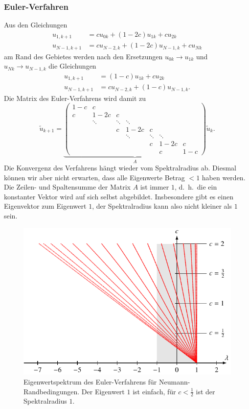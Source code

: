 \subsubsection{Euler-Verfahren}
Aus den Gleichungen
\begin{align*}
u_{1,k+1} &= c u_{0k} + (1-2c) u_{1k} + c u_{2k} \\
u_{N-1,k+1} &= c u_{N-2,k} + (1-2c) u_{N-1,k} + c u_{Nk} 
\end{align*}
am Rand des Gebietes werden nach den Ersetzungen
$u_{0k}\to u_{1k}$
und
$u_{Nk}\to u_{N-1,k}$
die Gleichungen
\begin{align*}
u_{1,k+1}
&=
(1-c) u_{1k} + c u_{2k}
\\
u_{N-1,k+1}
&=
c u_{N-2,k} + (1-c) u_{N-1,k}.
\end{align*}
Die Matrix des Euler-Verfahrens wird damit zu
\begin{equation}
\tilde{u}_{k+1}
=
\underbrace{
\begin{pmatrix}
 1- c &  c   &      &      &      &      &      \\
  c   & 1-2c &  c   &      &      &      &      \\
      &\ddots&\ddots&\ddots&      &      &      \\
      &      &  c   & 1-2c &  c   &      &      \\
      &      &      &\ddots&\ddots&\ddots&      \\
      &      &      &      &  c   & 1-2c &  c   \\
      &      &      &      &      &  c   & 1- c 
\end{pmatrix}}_{\displaystyle A}
\tilde{u}_k.
\end{equation}
Die Konvergenz des Verfahrens hängt wieder vom Spektralradius ab.
Diesmal können wir aber nicht erwarten, dass alle Eigenwerte
Betrag $<1$ haben werden.
Die Zeilen- und Spaltensumme der Matrix $A$ ist immer $1$, d.~h.~die
ein konstanter Vektor wird auf sich selbst abgebildet.
Insbesondere gibt es einen Eigenvektor zum Eigenwert $1$,
der Spektralradius kann also nicht kleiner als $1$ sein. 
\begin{figure}
\centering
\includegraphics{chapters/70-pde/images/explizitneumann.pdf}
\caption{Eigenwertspektrum des Euler-Verfahrens für
Neumann-Randbedingungen.
Der Eigenwert $1$ ist einfach,
für $c<\frac12$ ist der Spektralradius $1$.
\label{buch:pde:waerme:explizit:neumannspektrum}}
\end{figure}
